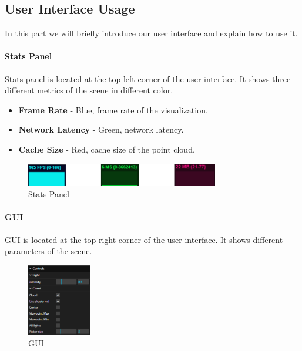\documentclass[11pt, a4paper,oneside,chapterprefix=false]{scrbook}
\begin{document}
\subsection{User Interface Usage}

In this part we will briefly introduce our user interface and explain how to use it.

\paragraph{Stats Panel}

Stats panel is located at the top left corner of the user interface. It shows three different metrics of the scene in different color.

\begin{itemize}
	\item \textbf{Frame Rate} - Blue, frame rate of the visualization.
	\item \textbf{Network Latency} - Green, network latency.
	\item \textbf{Cache Size} - Red, cache size of the point cloud.
\end{itemize}


\begin{figure}[H]
    \centering
    \includegraphics*[width=0.75\textwidth]{figures/stats panel.png}
    \caption{Stats Panel}
    \label{fig:stats panel}
\end{figure}

\paragraph{GUI}

GUI is located at the top right corner of the user interface. It shows different parameters of the scene.

\begin{figure}[H]
    \centering
    \includegraphics*[width=0.25\textwidth]{figures/GUI.png}
    \caption{GUI}
    \label{fig:gui}
\end{figure}
\end{document}
